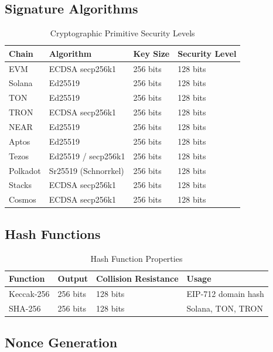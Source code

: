 \subsection{Signature Algorithms}

\begin{table}[htbp]
\centering
\caption{Cryptographic Primitive Security Levels}
\label{tab:crypto-security}
\begin{tabular}{llll}
\toprule
\textbf{Chain} & \textbf{Algorithm} & \textbf{Key Size} & \textbf{Security Level} \\
\midrule
EVM & ECDSA secp256k1 & 256 bits & 128 bits \\
Solana & Ed25519 & 256 bits & 128 bits \\
TON & Ed25519 & 256 bits & 128 bits \\
TRON & ECDSA secp256k1 & 256 bits & 128 bits \\
NEAR & Ed25519 & 256 bits & 128 bits \\
Aptos & Ed25519 & 256 bits & 128 bits \\
Tezos & Ed25519 / secp256k1 & 256 bits & 128 bits \\
Polkadot & Sr25519 (Schnorrkel) & 256 bits & 128 bits \\
Stacks & ECDSA secp256k1 & 256 bits & 128 bits \\
Cosmos & ECDSA secp256k1 & 256 bits & 128 bits \\
\bottomrule
\end{tabular}
\end{table}

\subsection{Hash Functions}

\begin{table}[htbp]
\centering
\caption{Hash Function Properties}
\label{tab:hash-security}
\begin{tabular}{llll}
\toprule
\textbf{Function} & \textbf{Output} & \textbf{Collision Resistance} & \textbf{Usage} \\
\midrule
Keccak-256 & 256 bits & 128 bits & EIP-712 domain hash \\
SHA-256 & 256 bits & 128 bits & Solana, TON, TRON \\
\bottomrule
\end{tabular}
\end{table}

\subsection{Nonce Generation}

